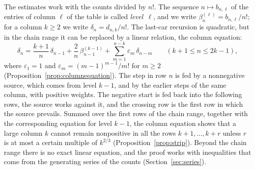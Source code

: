 \documentclass{amsart}
\theoremstyle{definition}
\theoremstyle{remark}
\numberwithin{equation}{section}
\begin{document}
The estimates work with the counts divided by $n!$. The sequence $n\mapsto b_{n,\ell}$ of the entries of column $\ell$ of the table is called \emph{level}~$\ell$, and we write $\beta^{(\ell)}_n=b_{n,\ell}/n!$; for a column $k\ge 2$ we write $\delta_n=d_{n,k}/n!$. The last-car recursion is quadratic, but in the chain range it can be replaced by a linear relation, the column equation:
\[
\delta_n=\frac{k+1}{n}\,\delta_{n-1}+\frac{2}{n}\,\beta^{(k-1)}_{n-1}+\sum_{m=1}^{n-k}\varepsilon_m\,\delta_{n-m}\qquad(k+1\le n\le 2k-1),
\]
where $\varepsilon_1=1$ and $\varepsilon_m=(m-1)^{m-1}/m!$ for $m\ge 2$ (Proposition~\ref{prop:columnequation}). The step in row $n$ is fed by a nonnegative source, which comes from level $k-1$, and by the earlier steps of the same column, with positive weights. The negative start is fed back into the following rows, the source works against it, and the crossing row is the first row in which the source prevails. Summed over the first rows of the chain range, together with the corresponding equation for level $k-1$, the column equation shows that a large column $k$ cannot remain nonpositive in all the rows $k+1,\dots,k+r$ unless $r$ is at most a certain multiple of $k^{2/3}$ (Proposition~\ref{prop:strip}). Beyond the chain range there is no exact linear equation, and the proof works with inequalities that come from the generating series of the counts (Section~\ref{sec:series}).
\end{document}
